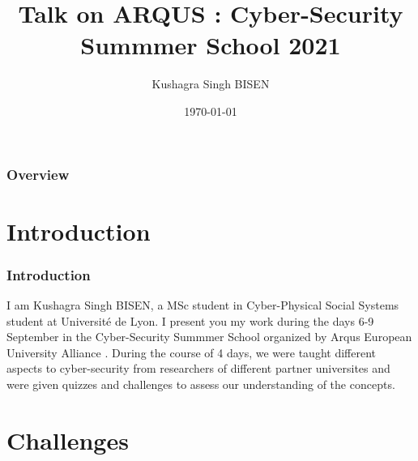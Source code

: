 \documentclass{beamer}
\title[ARQUS 2021]{Talk on ARQUS : Cyber-Security Summmer School 2021} %
\author{Kushagra Singh BISEN} %
\institute[Universit\'e de Lyon] %
{
Universit\'e de Lyon          \\ %
\medskip
\textit{kushagra.bisen@etu.univ-st-etienne.fr} %
}
\date{\today} %
\begin{document}
\begin{frame}
\titlepage %
\end{frame}

\begin{frame}
\frametitle{Overview} %
\tableofcontents %
\end{frame}


\section{Introduction}

\begin{frame}
    \frametitle{Introduction}
    I am Kushagra Singh BISEN, a MSc student in Cyber-Physical Social Systems student at 
    Universit\'e de Lyon. I present you my work during the days 6-9 September in the Cyber-Security Summmer
    School organized by Arqus European University Alliance \cite{p1}.  \newline
    During the course of 4 days, we were taught different aspects to cyber-security from researchers of different partner universites 
    and were given quizzes and challenges to assess our understanding of the concepts.
\end{frame}

\section{Challenges}
\end{document}
